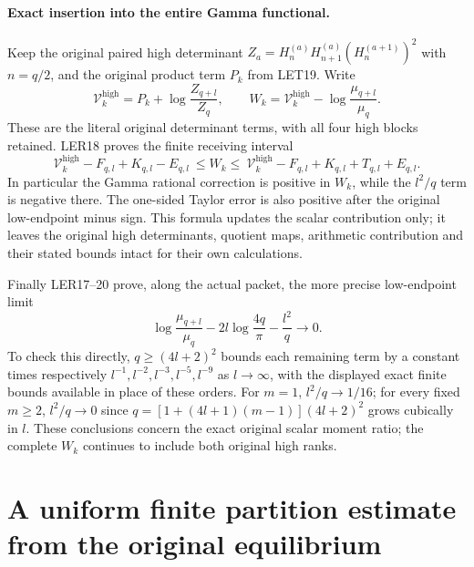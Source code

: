 \documentclass[11pt,a4paper]{article}
\begin{document}
\paragraph{Exact insertion into the entire Gamma functional.}
Keep the original paired high determinant
$Z_a=H_n^{(a)}H_{n+1}^{(a)}(H_n^{(a+1)})^2$ with $n=q/2$, and
the original product term $P_k$ from LET19. Write
\[
 \mathcal V_k^{\mathrm{high}}=P_k+\log\frac{Z_{q+l}}{Z_q},\qquad
 W_k=\mathcal V_k^{\mathrm{high}}-\log\frac{\mu_{q+l}}{\mu_q}.
 \tag{LER21}
\]
These are the literal original determinant terms, with all four
high blocks retained. LER18 proves the finite receiving interval
\[
 \boxed{\displaystyle
 \mathcal V_k^{\mathrm{high}}-F_{q,l}+K_{q,l}-E_{q,l}
 \ \le W_k\le\
 \mathcal V_k^{\mathrm{high}}-F_{q,l}+K_{q,l}+T_{q,l}+E_{q,l}.}
 \tag{LER22}
\]
In particular the Gamma rational correction is positive in $W_k$,
while the $l^2/q$ term is negative there. The one-sided Taylor error
is also positive after the original low-endpoint minus sign.
This formula updates the scalar contribution only; it leaves the
original high determinants, quotient maps, arithmetic contribution
and their stated bounds intact for their own calculations.

Finally LER17--20 prove, along the actual packet, the more precise
low-endpoint limit
\[
 \log\frac{\mu_{q+l}}{\mu_q}-2l\log\frac{4q}{\pi}
 -\frac{l^2}{q}\longrightarrow0.
 \tag{LER23}
\]
To check this directly, $q\ge(4l+2)^2$ bounds each remaining term by
a constant times respectively $l^{-1},l^{-2},l^{-3},l^{-5},l^{-9}$
as $l\to\infty$, with the displayed exact finite bounds available
in place of these orders. For $m=1$, $l^2/q\to1/16$; for every
fixed $m\ge2$, $l^2/q\to0$ since
$q=[1+(4l+1)(m-1)](4l+2)^2$ grows cubically in $l$.
These conclusions concern the exact original scalar moment ratio;
the complete $W_k$ continues to include both original high ranks.


\clearpage

\section{A uniform finite partition estimate from the original equilibrium}
\label{sec:QLG}
\end{document}
